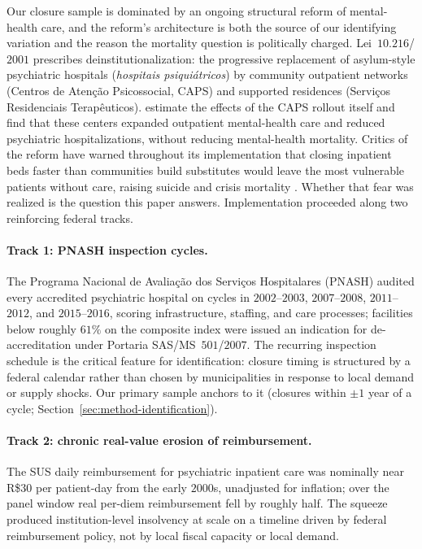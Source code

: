 Our closure sample is dominated by an ongoing structural reform of
mental-health care, and the reform's architecture is both the source of
our identifying variation and the reason the mortality question is
politically charged. Lei~$10.216$/$2001$ prescribes deinstitutionalization:
the progressive replacement of asylum-style psychiatric hospitals
(\emph{hospitais psiquiátricos}) by community outpatient networks
(Centros de Atenção Psicossocial, CAPS) and supported residences
(Serviços Residenciais Terapêuticos). \citet{diasFontes2024} estimate
the effects of the CAPS rollout itself and find that these centers
expanded outpatient mental-health care and reduced psychiatric
hospitalizations, without reducing mental-health mortality. Critics of
the reform have warned throughout its implementation that closing
inpatient beds faster than communities build substitutes would leave the
most vulnerable patients without care, raising suicide and crisis mortality
\citep{bastiampillai2016, yoonBruckner2009}.
Whether that fear was realized is the question this paper answers.
Implementation proceeded along two reinforcing federal tracks.

\paragraph{Track 1: PNASH inspection cycles.} The Programa Nacional de
Avaliação dos Serviços Hospitalares (PNASH) audited every accredited
psychiatric hospital on cycles in $2002$--$2003$, $2007$--$2008$,
$2011$--$2012$, and $2015$--$2016$, scoring infrastructure, staffing,
and care processes; facilities below roughly $61\%$ on the composite
index were issued an indication for de-accreditation under Portaria
SAS/MS~$501$/$2007$. The recurring inspection schedule is the critical
feature for identification: closure timing is structured by a federal
calendar rather than chosen by municipalities in response to local
demand or supply shocks.
Our primary sample anchors to it (closures within $\pm 1$ year of a
cycle; Section~\ref{sec:method-identification}).

\paragraph{Track 2: chronic real-value erosion of reimbursement.} The
SUS daily reimbursement for psychiatric inpatient care was nominally
near R\$$30$ per patient-day from the early $2000$s, unadjusted for
inflation; over the panel window real per-diem reimbursement fell by
roughly half. The squeeze produced institution-level insolvency at scale
on a timeline driven by federal reimbursement policy, not by local
fiscal capacity or local demand.

